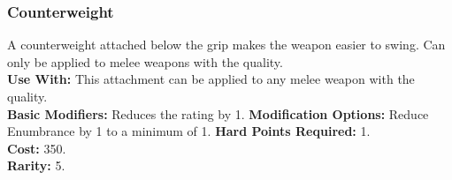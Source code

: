 \subsubsection{Counterweight}
A counterweight attached below the grip makes the
weapon easier to swing. Can only be applied to melee
weapons with the  quality.\\
\textbf{Use With:} This attachment can be applied to any
    melee weapon with the  quality.\\
\textbf{Basic Modifiers:} Reduces the  rating by 1.
\textbf{Modification Options:} Reduce Enumbrance by 1 to a
minimum of 1.
\textbf{Hard Points Required:} 1.\\
\textbf{Cost:} 350.\\
\textbf{Rarity:} 5.\\
